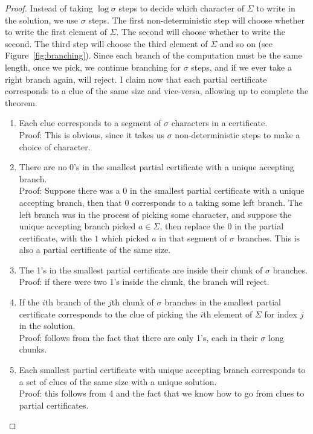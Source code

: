 \documentclass[runningheads,a4paper]{llncs}
\begin{document}
\begin{proof}
Instead of taking $\log \sigma$ steps to decide which character of $\Sigma$ to write in the solution, we use $\sigma$ steps. The first non-deterministic step will choose whether to write the first element of $\Sigma$. The second will choose whether to write the second. The third step will choose the third element of $\Sigma$ and so on (see Figure~\ref{fig:branching}). Since each branch of the computation must be the same length, once we pick, we continue branching for $\sigma$ steps, and if we ever take a right branch again, will reject. I claim now that each partial certificate corresponds to a clue of the same size and vice-versa, allowing up to complete the theorem.
\begin{enumerate}
\item Each clue corresponds to a segment of $\sigma$ characters in a certificate.\\
Proof: This is obvious, since it takes us $\sigma$ non-deterministic steps to make a choice of character.
\item There are no 0's in the smallest partial certificate with a unique accepting branch.\\
Proof: Suppose there was a 0 in the smallest partial certificate with a unique accepting branch, then that 0 corresponds to a taking some left branch. The left branch was in the process of picking some character, and suppose the unique accepting branch picked $a \in \Sigma$, then replace the 0 in the partial certificate, with the $1$ which picked $a$ in that segment of $\sigma$ branches. This is also a partial certificate of the same size. 
\item The 1's in the smallest partial certificate are inside their chunk of $\sigma$ branches.\\
Proof: if there were two 1's inside the chunk, the branch will reject.
\item If the $i$th branch of the $j$th chunk of $\sigma$ branches in the smallest partial certificate corresponds to the clue of picking the $i$th element of $\Sigma$ for index $j$ in the solution.\\
Proof: follows from the fact that there are only 1's, each in their $\sigma$ long chunks.
\item Each smallest partial certificate with unique accepting branch corresponds to a set of clues of the same size with a unique solution. \\
Proof: this follows from 4 and the fact that we know how to go from clues to partial certificates.
\end{enumerate}
\end{proof}
\end{document}

